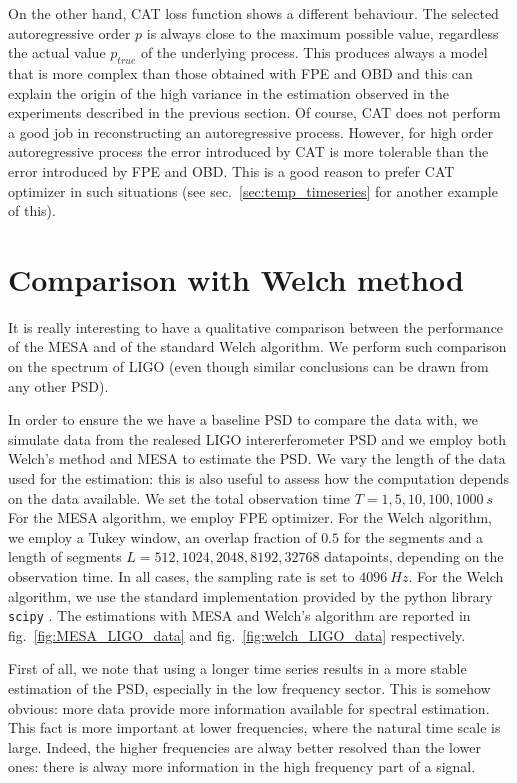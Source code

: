 \documentclass[twocolumn,showpacs,preprintnumbers,nofootinbib,prd,
superscriptaddress,10pt]{revtex4-1}
\begin{document}
On the other hand, CAT loss function shows a different behaviour. The selected autoregressive order $p$ is always close to the maximum possible value, regardless the actual value $p_{true}$ of the underlying process. This produces always a model that is more complex than those obtained with FPE and OBD and this can explain the origin of the high variance in the estimation observed in the experiments described in the previous section.
Of course, CAT does not perform a good job in reconstructing an autoregressive process. However, for high order autoregressive process the error introduced by CAT is more tolerable than the error introduced by FPE and OBD. This is a good reason to prefer CAT optimizer in such situations (see sec.~\ref{sec:temp_timeseries} for another example of this).

\section{Comparison with Welch method}\label{sec:Welch_comparison}
It is really interesting to have a qualitative comparison between the performance of the MESA and of the standard Welch algorithm.
We perform such comparison on the spectrum of LIGO (even though similar conclusions can be drawn from any other PSD).

In order to ensure the we have a baseline PSD to compare the data with, we simulate data from the realesed LIGO intererferometer PSD and we employ both Welch's method and MESA to estimate the PSD.
We vary the length of the data used for the estimation: this is also useful to assess how the computation depends on the data available. We set the total observation time $T = 1, 5, 10, 100, 1000 \SI{}{s}$
For the MESA algorithm, we employ FPE optimizer. For the Welch algorithm, we employ a Tukey window, an overlap fraction of $0.5$ for the segments and a length of segments $L = 512, 1024, 2048, 8192, 32768$ datapoints, depending on the observation time.
In all cases, the sampling rate is set to $\SI{4096}{Hz}$.
For the Welch algorithm, we use the standard implementation provided by the python library \texttt{scipy} \cite{numpy,scipy}.
The estimations with MESA and Welch's algorithm are reported in fig.~\ref{fig:MESA_LIGO_data} and fig.~\ref{fig:welch_LIGO_data} respectively.

First of all, we note that using a longer time series results in a more stable estimation of the PSD, especially in the low frequency sector. This is somehow obvious: more data provide more information available for spectral estimation. This fact is more important at lower frequencies, where the natural time scale is large. Indeed, the higher frequencies are alway better resolved than the lower ones: there is alway more information in the high frequency part of a signal.
\end{document}
